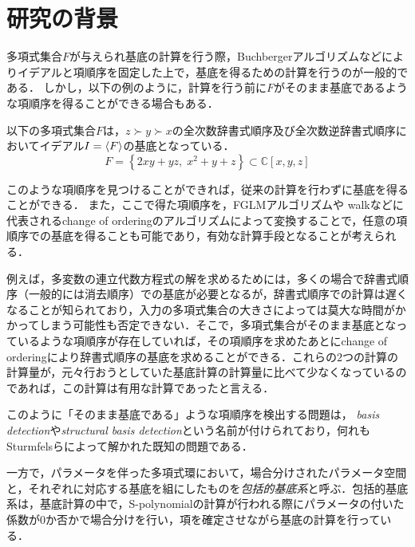 \section{研究の背景}
多項式集合$F$が与えられ\groebner{}基底の計算を行う際，Buchbergerアルゴリズム\cite{buchberger2006bruno}などによりイデアルと項順序を固定した上で，\groebner{}基底を得るための計算を行うのが一般的である．
しかし，以下の例のように，計算を行う前に$F$がそのまま\groebner{}基底であるような項順序を得ることができる場合もある．
\begin{example}
	以下の多項式集合$F$は，$z \succ y \succ x$の全次数辞書式順序及び全次数逆辞書式順序においてイデアル$I = \langle F \rangle$の\groebner{}基底となっている．
	$$F = \left\{ 2xy + yz, \; x^2 + y + z \right\} \subset \mathbb{C}[x, y, z]$$
\end{example}
このような項順序を見つけることができれば，従来の計算を行わずに\groebner{}基底を得ることができる．
また，ここで得た項順序を，FGLMアルゴリズム\cite{faugere1993efficient}や\groebner{} walk\cite{collart1993grobner}などに代表されるchange of orderingのアルゴリズムによって変換することで，任意の項順序での\groebner{}基底を得ることも可能であり，有効な計算手段となることが考えられる．
\par
例えば，多変数の連立代数方程式の解を求めるためには，多くの場合で辞書式順序（一般的には消去順序）での\groebner{}基底が必要となるが，辞書式順序での計算は遅くなることが知られており，入力の多項式集合の大きさによっては莫大な時間がかかってしまう可能性も否定できない．そこで，多項式集合がそのまま\groebner{}基底となっているような項順序が存在していれば，その項順序を求めたあとにchange of orderingにより辞書式順序の\groebner{}基底を求めることができる．これらの$2$つの計算の計算量が，元々行おうとしていた\groebner{}基底計算の計算量に比べて少なくなっているのであれば，この計算は有用な計算であったと言える．
\par
このように「そのまま\groebner{}基底である」ような項順序を検出する問題は，\emph{\groebner{} basis detection}\cite{gritzmann1993minkowski}や\emph{structural \groebner{} basis detection}\cite{sturmfels1997structural}という名前が付けられており，何れもSturmfelsらによって解かれた既知の問題である．
\par
一方で，パラメータを伴った多項式環において，場合分けされたパラメータ空間と，それぞれに対応する\groebner{}基底を組にしたものを\emph{包括的\groebner{}基底系}\cite{weispfenning1992comprehensive}と呼ぶ．包括的\groebner{}基底系は，\groebner{}基底計算の中で，\textrm{S-polynomial}の計算が行われる際にパラメータの付いた係数が$0$か否かで場合分けを行い，項を確定させながら\groebner{}基底の計算を行っている．
